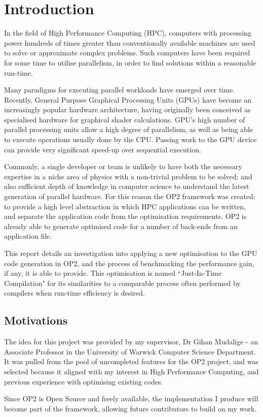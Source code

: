 
\section{Introduction}

In the field of High Performance Computing (HPC), computers with processing power hundreds of times greater than conventionally available machines are used to solve or approximate complex problems. Such computers have been required for some time to utilise parallelism, in order to find solutions within a reasonable run-time.
\par Many paradigms for executing parallel workloads have emerged over time. Recently, General Purpose Graphical Processing Units (GPUs) have become an increasingly popular hardware architecture, having originally been conceived as specialised hardware for graphical shader calculations. GPU's high number of parallel processing units allow a high degree of parallelism, as well as being able to execute operations usually done by the CPU. Passing work to the GPU device can provide very significant speed-up over sequential execution.
\par
Commonly, a single developer or team is unlikely to have both the necessary expertise in a niche area of physics with a non-trivial problem to be solved; and also sufficient depth of knowledge in computer science to understand the latest generation of parallel hardware. For this reason the OP2 framework was created: to provide a high level abstraction in which HPC applications can be written, and separate the application code from the optimisation requirements. OP2 is already able to generate optimised code for a number of back-ends from an application file.
\par
This report details an investigation into applying a new optimisation to the GPU code generation in OP2, and the process of benchmarking the performance gain, if any, it is able to provide.
This optimisation is named ``Just-In-Time Compilation" for its similarities to a comparable process often performed by compilers when run-time efficiency is desired.
\vfill
\subsection{Motivations}
The idea for this project was provided by my supervisor, Dr Gihan Mudalige - an Associate Professor in the University of Warwick Computer Science Department. It was pulled from the pool of uncompleted features for the OP2 project, and was selected because it aligned with my interest in High Performance Computing, and previous experience with optimising existing codes.
\par
Since OP2 is Open Source and freely available, the implementation I produce will become part of the framework, allowing future contributors to build on my work.

